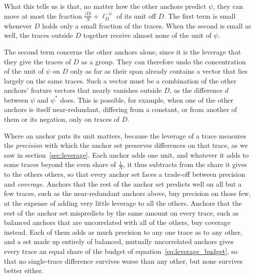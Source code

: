 \documentclass[titlepage,a4paper,11pt]{report}
\begin{document}
    What this tells us is that, no matter how the other anchors predict $\psi$, they can move at most the fraction $\frac{|D|}{N}+\ell_D^{-\psi}$ of its unit off $D$. The first term is small whenever $D$ holds only a small fraction of the traces. When the second is small as well, the traces outside $D$ together receive almost none of the unit of $\psi$.

    The second term concerns the other anchors alone, since it is the leverage that they give the traces of $D$ as a group. They can therefore undo the concentration of the unit of $\psi$ on $D$ only as far as their span already contains a vector that lies largely on the same traces. Such a vector must be a combination of the other anchors' feature vectors that nearly vanishes outside $D$, as the difference $d$ between $\psi$ and $\psi^\ast$ does. This is possible, for example, when one of the other anchors is itself near-redundant, differing from a constant, or from another of them or its negation, only on traces of $D$.

    Where an anchor puts its unit matters, because the leverage of a trace measures the \emph{precision} with which the anchor set preserves differences on that trace, as we saw in section~\ref{sec:leverage}. Each anchor adds one unit, and whatever it adds to some traces beyond the even share of $\frac1N$, it thus subtracts from the share it gives to the others others, so that every anchor set faces a trade-off between precision and \emph{coverage}. Anchors that the rest of the anchor set predicts well on all but a few traces, such as the near-redundant anchors above, buy precision on those few, at the expense of adding very little leverage to all the others. Anchors that the rest of the anchor set mispredicts by the same amount on every trace, such as balanced anchors that are uncorrelated with all of the others, buy coverage instead. Each of them adds as much precision to any one trace as to any other, and a set made up entirely of balanced, mutually uncorrelated anchors gives every trace an equal share of the budget of equation~\eqref{eq:leverage_budget}, so that no single-trace difference survives worse than any other, but none survives better either.
\end{document}
